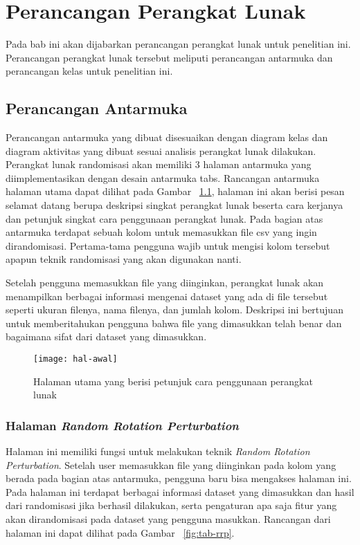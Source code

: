 \chapter{Perancangan Perangkat Lunak}
\label{chap:perancangan}

Pada bab ini akan dijabarkan perancangan perangkat lunak untuk penelitian ini. Perancangan perangkat lunak tersebut meliputi perancangan antarmuka dan perancangan kelas untuk penelitian ini.

\section{Perancangan Antarmuka}
\label{sec:antarmuka}

Perancangan antarmuka yang dibuat disesuaikan dengan diagram kelas dan diagram aktivitas yang dibuat sesuai analisis perangkat lunak dilakukan. Perangkat lunak randomisasi akan memiliki 3 halaman antarmuka yang diimplementasikan dengan desain antarmuka tabs. Rancangan antarmuka halaman utama dapat dilihat pada Gambar ~\ref{fig:hal-awal}, halaman ini akan berisi pesan selamat datang berupa deskripsi singkat perangkat lunak beserta cara kerjanya dan petunjuk singkat cara penggunaan perangkat lunak. Pada bagian atas antarmuka terdapat sebuah kolom untuk memasukkan file csv yang ingin dirandomisasi. Pertama-tama pengguna wajib untuk mengisi kolom tersebut apapun teknik randomisasi yang akan digunakan nanti.

Setelah pengguna memasukkan file yang diinginkan, perangkat lunak akan menampilkan berbagai informasi mengenai dataset yang ada di file tersebut seperti ukuran filenya, nama filenya, dan jumlah kolom. Deskripsi ini bertujuan untuk memberitahukan pengguna bahwa file yang dimasukkan telah benar dan bagaimana sifat dari dataset yang dimasukkan. 

\begin{figure}
	\centering
	\texttt{[image: hal-awal]}
	\caption{Halaman utama yang berisi petunjuk cara penggunaan perangkat lunak}
	\label{fig:hal-awal}
\end{figure}

\subsection{Halaman \textit{Random Rotation Perturbation}}
\label{subsec:tabrrp}

Halaman ini memiliki fungsi untuk melakukan teknik \textit{Random Rotation Perturbation}. Setelah user memasukkan file yang diinginkan pada kolom yang berada pada bagian atas antarmuka, pengguna baru bisa mengakses halaman ini. Pada halaman ini terdapat berbagai informasi dataset yang dimasukkan dan hasil dari randomisasi jika berhasil dilakukan, serta pengaturan apa saja fitur yang akan dirandomisasi pada dataset yang pengguna masukkan. Rancangan dari halaman ini dapat dilihat pada Gambar ~\ref{fig:tab-rrp}.

